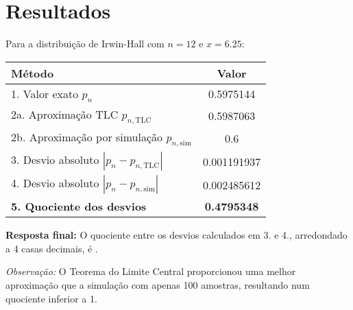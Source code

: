 \documentclass[11pt,a4paper]{article}
\begin{document}
\section*{Resultados}

\begin{tcolorbox}[colback=green!5!white,colframe=green!75!black,title=Solução]
Para a distribuição de Irwin-Hall com \( n = 12 \) e \( x = 6.25 \):

\begin{center}
\begin{tabular}{|l|c|}
\hline
\textbf{Método} & \textbf{Valor} \\
\hline
1. Valor exato \( p_n \) & 0.5975144 \\
2a. Aproximação TLC \( p_{n,\text{TLC}} \) & 0.5987063 \\
2b. Aproximação por simulação \( p_{n,\text{sim}} \) & 0.6 \\
\hline
3. Desvio absoluto \( |p_n - p_{n,\text{TLC}}| \) & 0.001191937 \\
4. Desvio absoluto \( |p_n - p_{n,\text{sim}}| \) & 0.002485612 \\
\hline
\textbf{5. Quociente dos desvios} & \textbf{0.4795348} \\
\hline
\end{tabular}
\end{center}

\vspace{0.5cm}
\textbf{Resposta final:} O quociente entre os desvios calculados em 3. e 4., arredondado a 4 casas decimais, é .

\vspace{0.3cm}
\textit{Observação:} O Teorema do Limite Central proporcionou uma melhor aproximação que a simulação com apenas 100 amostras, resultando num quociente inferior a 1.
\end{tcolorbox}
\end{document}

